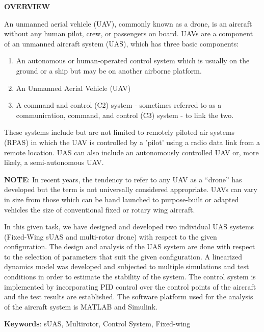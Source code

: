 \thispagestyle{plain}
\begin{center}
    \Large \textbf{\uppercase{Overview}}
\end{center}

\vspace{3\baselineskip}

\noindent
An unmanned aerial vehicle (UAV), commonly known as a drone, is an aircraft without any human pilot, crew, or passengers on board. UAVs are a component of an unmanned aircraft system (UAS), which has three basic components:
\begin{enumerate}
	\item An autonomous or human-operated control system which is usually on the ground or a ship but may be on another airborne platform.
	\item An Unmanned Aerial Vehicle (UAV)
	\item A command and control (C2) system - sometimes referred to as a communication, command, and control (C3) system - to link the two.
\end{enumerate}

\noindent These systems include but are not limited to remotely piloted air systems (RPAS) in which the UAV is controlled by a 'pilot' using a radio data link from a remote location. UAS can also include an autonomously controlled UAV or, more likely, a semi-autonomous UAV.

 \vspace{\baselineskip}
 
\noindent \textbf{NOTE}: In recent years, the tendency to refer to any UAV as a ``drone'' has developed but the term is not universally considered appropriate. UAVs can vary in size from those which can be hand launched to purpose-built or adapted vehicles the size of conventional fixed or rotary wing aircraft.

 \vspace{\baselineskip}

\noindent In this given task, we have designed and developed two individual UAS systems (Fixed-Wing sUAS and multi-rotor drone) with respect to the given configuration. The design and analysis of the UAS system are done with respect to the selection of parameters that suit the given configuration. A linearized dynamics model was developed and subjected to multiple simulations and test conditions in order to estimate the stability of the system. The control system is implemented by incorporating PID control over the control points of the aircraft and the test results are established. The software platform used for the analysis of the aircraft system is MATLAB and Simulink.

\vspace{\baselineskip}

\noindent
\textbf{Keywords}: sUAS, Multirotor, Control System, Fixed-wing
